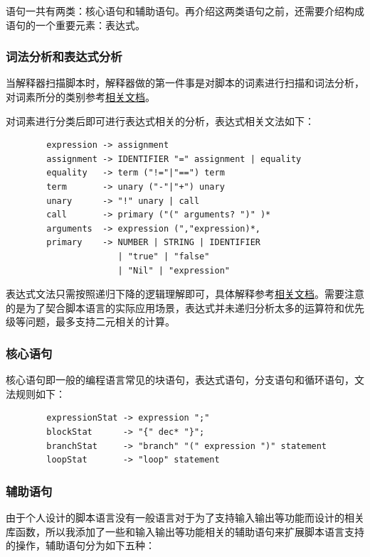 \documentclass[12pt]{article}
\begin{document}
    语句一共有两类：核心语句和辅助语句。再介绍这两类语句之前，还需要介绍构成语句的一个重要元素：表达式。

    \subsubsection{词法分析和表达式分析}

    当解释器扫描脚本时，解释器做的第一件事是对脚本的词素进行扫描和词法分析，对词素所分的类别参考\href{generate_by_cargo/robot_dsl/token/enum.TokenType.html}{相关文档}。

    对词素进行分类后即可进行表达式相关的分析，表达式相关文法如下：

    \begin{verbatim}
        expression -> assignment
        assignment -> IDENTIFIER "=" assignment | equality
        equality   -> term ("!="|"==") term
        term       -> unary ("-"|"+") unary
        unary      -> "!" unary | call
        call       -> primary ("(" arguments? ")" )*
        arguments  -> expression (","expression)*,
        primary    -> NUMBER | STRING | IDENTIFIER 
                      | "true" | "false" 
                      | "Nil" | "expression"   
    \end{verbatim}

    表达式文法只需按照递归下降的逻辑理解即可，具体解释参考\href{generate_by_cargo/robot_dsl/syntax/enum.Expr.html}{相关文档}。需要注意的是为了契合脚本语言的实际应用场景，表达式并未递归分析太多的运算符和优先级等问题，最多支持二元相关的计算。

    \subsubsection{核心语句}

    核心语句即一般的编程语言常见的块语句，表达式语句，分支语句和循环语句，文法规则如下：

    \begin{verbatim}
        expressionStat -> expression ";"
        blockStat      -> "{" dec* "}";
        branchStat     -> "branch" "(" expression ")" statement
        loopStat       -> "loop" statement
    \end{verbatim}

    \subsubsection{辅助语句}

    由于个人设计的脚本语言没有一般语言对于为了支持输入输出等功能而设计的相关库函数，所以我添加了一些和输入输出等功能相关的辅助语句来扩展脚本语言支持的操作，辅助语句分为如下五种：
\end{document}

